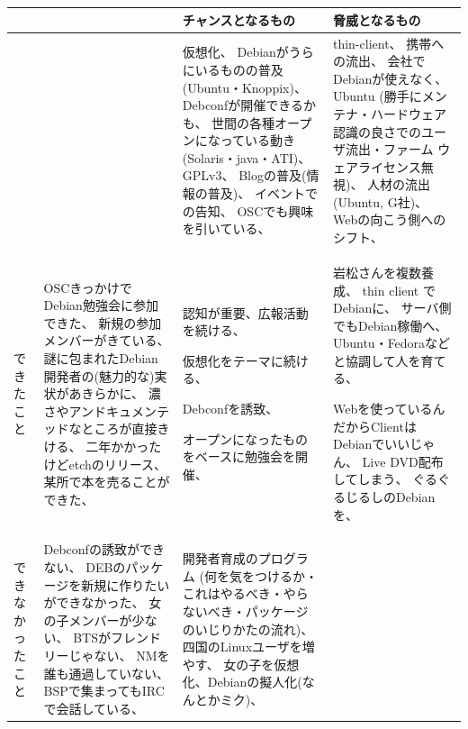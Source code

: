 \documentclass[cjk,dvipdfmx,12pt]{beamer}
\begin{document}
\section{}
\begin{frame}{}

{\tiny
\begin{tabular}[t]{|p{4em}|p{11em}|p{11em}|p{11em}|}
\hline
 &  & チャンスとなるもの & 脅威となるもの  \\\hline
 & &
仮想化、
Debianがうらにいるものの普及(Ubuntu・Knoppix)、
Debconfが開催できるかも、
世間の各種オープンになっている動き(Solaris・java・ATI)、
GPLv3、
Blogの普及(情報の普及)、
イベントでの告知、
OSCでも興味を引いている、
&
thin-client、
携帯への流出、
会社でDebianが使えなく、
Ubuntu (勝手にメンテナ・ハードウェア認識の良さでのユーザ流出・ファーム
	     ウェアライセンス無視)、
人材の流出(Ubuntu, G社)、
Webの向こう側へのシフト、
\\
\hline
できたこと &

 OSCきっかけでDebian勉強会に参加できた、
 新規の参加メンバーがきている、
 謎に包まれたDebian開発者の(魅力的な)実状があきらかに、
 濃さやアンドキュメンテッドなところが直接きける、
 二年かかったけどetchのリリース、
 某所で本を売ることができた、

&

 認知が重要、広報活動を続ける、

 仮想化をテーマに続ける、

 Debconfを誘致、

 オープンになったものをベースに勉強会を開催、

&

 岩松さんを複数養成、
 thin client でDebianに、
 サーバ側でもDebian稼働へ、
 Ubuntu・Fedoraなどと協調して人を育てる、

 Webを使っているんだからClientはDebianでいいじゃん、
 Live DVD配布してしまう、
 ぐるぐるじるしのDebianを、

\\
\hline

できなかったこと
&
Debconfの誘致ができない、
DEBのパッケージを新規に作りたいができなかった、
女の子メンバーが少ない、
BTSがフレンドリーじゃない、
NMを誰も通過していない、
BSPで集まってもIRCで会話している、

&

開発者育成のプログラム (何を気をつけるか・これはやるべき・やらないべき・パッケージのいじりかたの流れ)、
四国のLinuxユーザを増やす、
女の子を仮想化、Debianの擬人化(なんとかミク)、

&



\\
\hline
\end{tabular}
}

\end{frame}
\end{document}
